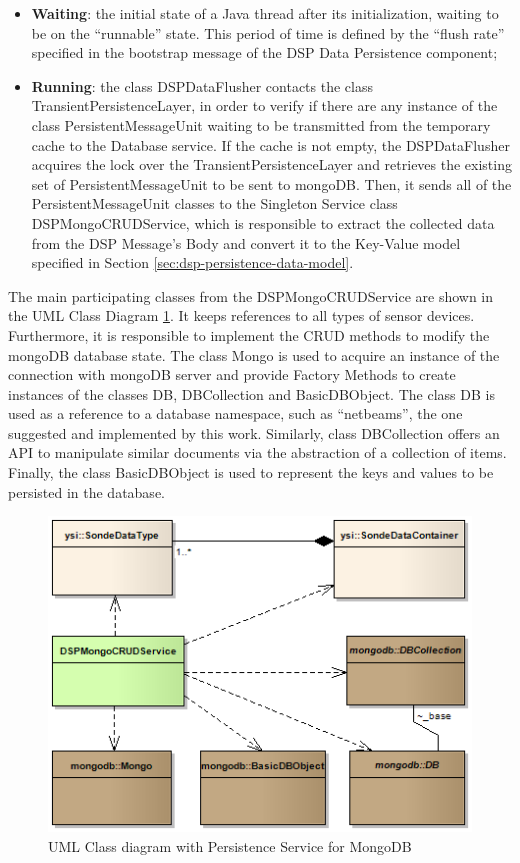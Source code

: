 \begin{itemize}
  \item \textbf{Waiting}: the initial state of a Java thread
  after its initialization, waiting to be on the ``runnable'' state. This
  period of time is defined by the ``flush rate''  specified in the bootstrap
  message of the DSP Data Persistence component;
  \item \textbf{Running}: the class DSPDataFlusher contacts the class
  TransientPersistenceLayer, in order to verify if there are any instance of
  the class PersistentMessageUnit waiting to be transmitted from the temporary
  cache to the Database service. If the cache is not empty, the DSPDataFlusher 
  acquires the lock over the TransientPersistenceLayer and retrieves the
  existing set of PersistentMessageUnit to be sent to mongoDB. Then, it sends
  all of the PersistentMessageUnit classes to the Singleton Service class 
  DSPMongoCRUDService, which is responsible to extract the collected data from
  the DSP Message's Body and convert it to the Key-Value model specified in
  Section \ref{sec:dsp-persistence-data-model}.
\end{itemize}

The main participating classes from the DSPMongoCRUDService are shown in the
UML Class Diagram \ref{fig:DSP-Data-Persistence-Mongo-Classes}. It keeps references
to all types of sensor devices. Furthermore, it is responsible to implement the
CRUD methods to modify the mongoDB database state. The class Mongo is used to acquire
an instance of the connection with mongoDB server and provide Factory Methods 
\cite{gof} to create instances of the classes DB, DBCollection and
BasicDBObject. The class DB is used as a reference to a database namespace, 
such as ``netbeams'', the one suggested and implemented by this work. Similarly,
class DBCollection offers an API to manipulate similar documents via the
abstraction of a collection of items. Finally, the class BasicDBObject is used
to represent the keys and values to be persisted in the database.

\begin{figure}[!h]
  \centering
  \includegraphics[scale=0.65]{../diagrams/DSP-Data-Persistence-Mongo-Classes}
  \caption{UML Class diagram with Persistence Service for MongoDB}
  \label{fig:DSP-Data-Persistence-Mongo-Classes}
\end{figure}


